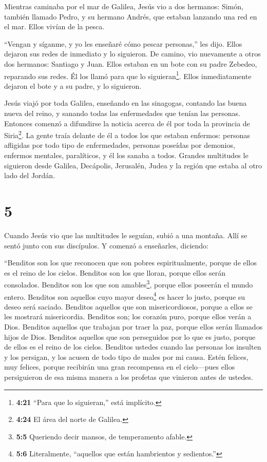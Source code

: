  Mientras caminaba por el mar de Galilea, Jesús vio a dos
hermanos: Simón, también llamado Pedro, y su hermano Andrés, que estaban
lanzando una red en el mar. Ellos vivían de la pesca.

 ``Vengan y síganme, y yo les enseñaré cómo pescar
personas,'' les dijo.  Ellos dejaron sus redes de inmediato
y lo siguieron.  De camino, vio nuevamente a otros dos
hermanos: Santiago y Juan. Ellos estaban en un bote con su padre
Zebedeo, reparando sus redes. Él los llamó para que lo
siguieran\footnote{\textbf{4:21} ``Para que lo siguieran,'' está
  implícito.}.  Ellos inmediatamente dejaron el bote y a su
padre, y lo siguieron.

 Jesús viajó por toda Galilea, enseñando en las sinagogas,
contando las buena nueva del reino, y sanando todas las enfermedades que
tenían las personas.  Entonces comenzó a difundirse la
noticia acerca de él por toda la provincia de Siria\footnote{\textbf{4:24}
  El área del norte de Galilea.}. La gente traía delante de él a todos
los que estaban enfermos: personas afligidas por todo tipo de
enfermedades, personas poseídas por demonios, enfermos mentales,
paralíticos, y él los sanaba a todos.  Grandes multitudes
le siguieron desde Galilea, Decápolis, Jerusalén, Judea y la región que
estaba al otro lado del Jordán.

\hypertarget{section-4}{%
\section{5}\label{section-4}}

 Cuando Jesús vio que las multitudes le seguían, subió a una
montaña. Allí se sentó junto con sus discípulos.  Y comenzó
a enseñarles, diciendo:

 ``Benditos son los que reconocen que son pobres
espiritualmente, porque de ellos es el reino de los cielos. 
Benditos son los que lloran, porque ellos serán consolados. 
Benditos son los que son amables\footnote{\textbf{5:5} Queriendo decir
  mansos, de temperamento afable.}, porque ellos poseerán el mundo
entero.  Benditos son aquellos cuyo mayor deseo\footnote{\textbf{5:6}
  Literalmente, ``aquellos que están hambrientos y sedientos.''} es
hacer lo justo, porque su deseo será saciado.  Benditos
aquellos que son misericordiosos, porque a ellos se les mostrará
misericordia.  Benditos son; los corazón puro, porque ellos
verán a Dios.  Benditos aquellos que trabajan por traer la
paz, porque ellos serán llamados hijos de Dios.  Benditos
aquellos que son perseguidos por lo que es justo, porque de ellos es el
reino de los cielos.  Benditos ustedes cuando las personas
los insulten y los persigan, y los acusen de todo tipo de males por mi
causa.  Estén felices, muy felices, porque recibirán una
gran recompensa en el cielo---pues ellos persiguieron de esa misma
manera a los profetas que vinieron antes de ustedes.

